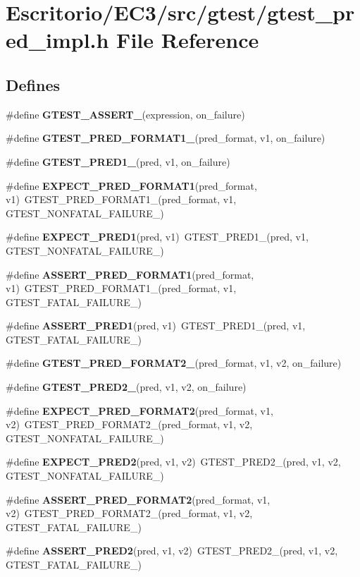 \section{Escritorio/EC3/src/gtest/gtest\_\-pred\_\-impl.h File Reference}
\label{gtest__pred__impl_8h}
\subsection*{Defines}
\begin{CompactItemize}
\item 
\#define {\bf GTEST\_\-ASSERT\_\-}(expression, on\_\-failure)
\item 
\#define {\bf GTEST\_\-PRED\_\-FORMAT1\_\-}(pred\_\-format, v1, on\_\-failure)
\item 
\#define {\bf GTEST\_\-PRED1\_\-}(pred, v1, on\_\-failure)
\item 
\#define {\bf EXPECT\_\-PRED\_\-FORMAT1}(pred\_\-format, v1)~GTEST\_\-PRED\_\-FORMAT1\_\-(pred\_\-format, v1, GTEST\_\-NONFATAL\_\-FAILURE\_\-)
\item 
\#define {\bf EXPECT\_\-PRED1}(pred, v1)~GTEST\_\-PRED1\_\-(pred, v1, GTEST\_\-NONFATAL\_\-FAILURE\_\-)
\item 
\#define {\bf ASSERT\_\-PRED\_\-FORMAT1}(pred\_\-format, v1)~GTEST\_\-PRED\_\-FORMAT1\_\-(pred\_\-format, v1, GTEST\_\-FATAL\_\-FAILURE\_\-)
\item 
\#define {\bf ASSERT\_\-PRED1}(pred, v1)~GTEST\_\-PRED1\_\-(pred, v1, GTEST\_\-FATAL\_\-FAILURE\_\-)
\item 
\#define {\bf GTEST\_\-PRED\_\-FORMAT2\_\-}(pred\_\-format, v1, v2, on\_\-failure)
\item 
\#define {\bf GTEST\_\-PRED2\_\-}(pred, v1, v2, on\_\-failure)
\item 
\#define {\bf EXPECT\_\-PRED\_\-FORMAT2}(pred\_\-format, v1, v2)~GTEST\_\-PRED\_\-FORMAT2\_\-(pred\_\-format, v1, v2, GTEST\_\-NONFATAL\_\-FAILURE\_\-)
\item 
\#define {\bf EXPECT\_\-PRED2}(pred, v1, v2)~GTEST\_\-PRED2\_\-(pred, v1, v2, GTEST\_\-NONFATAL\_\-FAILURE\_\-)
\item 
\#define {\bf ASSERT\_\-PRED\_\-FORMAT2}(pred\_\-format, v1, v2)~GTEST\_\-PRED\_\-FORMAT2\_\-(pred\_\-format, v1, v2, GTEST\_\-FATAL\_\-FAILURE\_\-)
\item 
\#define {\bf ASSERT\_\-PRED2}(pred, v1, v2)~GTEST\_\-PRED2\_\-(pred, v1, v2, GTEST\_\-FATAL\_\-FAILURE\_\-)
\item 

\end{CompactItemize}
